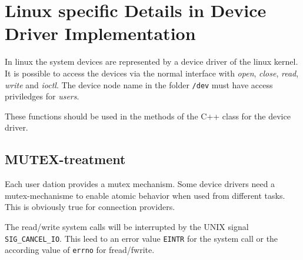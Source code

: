 \section{Linux specific Details in Device Driver Implementation}
In linux the system devices are represented by a device driver of
the linux kernel.
It is possible to access the devices via the normal interface
with {\em open}, {\em close}, {\em read}, {\em write} and {\em ioctl}.
The device node name in the folder \verb|/dev| must have access
priviledges for {\em users}.

These functions should be used in the methods of the C++ class 
for the device driver.

\subsection{MUTEX-treatment}
Each user dation provides a mutex mechanism. 
Some device drivers need a mutex-mechanisme to enable atomic behavior
when used from different tasks.
This is obviously true for connection providers.

The read/write system calls will be interrupted by the UNIX signal
\verb|SIG_CANCEL_IO|. This leed to an error value \texttt{EINTR} for
the system call or the according value of \texttt{errno} for fread/fwrite.

